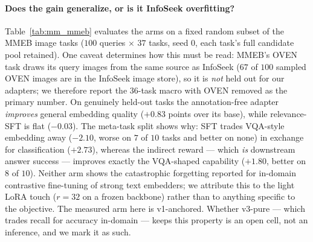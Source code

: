\paragraph{Does the gain generalize, or is it InfoSeek overfitting?}
Table~\ref{tab:mm_mmeb} evaluates the arms on a fixed random subset of the MMEB image tasks
($100$ queries $\times$ $37$ tasks, seed $0$, each task's full candidate pool retained).
One caveat determines how this must be read: MMEB's \textsc{OVEN} task draws its query images
from the same source as InfoSeek ($67$ of $100$ sampled OVEN images are in the InfoSeek image
store), so it is \emph{not} held out for our adapters; we therefore report the $36$-task macro
with OVEN removed as the primary number.
On genuinely held-out tasks the annotation-free adapter \emph{improves} general embedding
quality ($+0.83$ points over its base), while relevance-SFT is flat ($-0.03$). The
meta-task split shows why: SFT trades VQA-style embedding away (${-}2.10$, worse on $7$ of $10$
tasks and better on none) in exchange for classification ($+2.73$), whereas the indirect reward
--- which \emph{is} downstream answer success --- improves exactly the VQA-shaped capability
($+1.80$, better on $8$ of $10$). Neither arm shows the catastrophic forgetting reported for
in-domain contrastive fine-tuning of strong text embedders; we attribute this to the light
LoRA touch ($r{=}32$ on a frozen backbone) rather than to anything specific to the objective.
The measured arm here is v1-anchored. Whether v3-pure --- which trades recall for accuracy
in-domain --- keeps this property is an open cell, not an inference, and we mark it as such.

